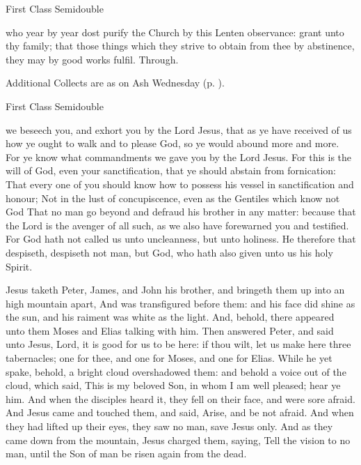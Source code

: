 \begin{inhead}
{First Class Semidouble}
\end{inhead}

\collect
{} who year by year dost purify the Church by this Lenten observance: grant unto thy family; that those things which they strive to obtain from thee by abstinence, they may by good works fulfil. Through.
\begin{rubric}
    Additional Collects are as on Ash Wednesday (p. \pageref{AshWednesdayMass}).
\end{rubric}


\begin{inhead}
{First Class Semidouble}
\end{inhead}

 we beseech you, and exhort you by the Lord Jesus, that as ye have received of us how ye ought to walk and to please God, so ye would abound more and more. For ye know what commandments we gave you by the Lord Jesus. For this is the will of God, even your sanctification, that ye should abstain from fornication: That every one of you should know how to possess his vessel in sanctification and honour; Not in the lust of concupiscence, even as the Gentiles which know not God That no man go beyond and defraud his brother in any matter: because that the Lord is the avenger of all such, as we also have forewarned you and testified. For God hath not called us unto uncleanness, but unto holiness. He therefore that despiseth, despiseth not man, but God, who hath also given unto us his holy Spirit.

 Jesus taketh Peter, James, and John his brother, and bringeth them up into an high mountain apart, And was transfigured before them: and his face did shine as the sun, and his raiment was white as the light. And, behold, there appeared unto them Moses and Elias talking with him. Then answered Peter, and said unto Jesus, Lord, it is good for us to be here: if thou wilt, let us make here three tabernacles; one for thee, and one for Moses, and one for Elias. While he yet spake, behold, a bright cloud overshadowed them: and behold a voice out of the cloud, which said, This is my beloved Son, in whom I am well pleased; hear ye him. And when the disciples heard it, they fell on their face, and were sore afraid. And Jesus came and touched them, and said, Arise, and be not afraid. And when they had lifted up their eyes, they saw no man, save Jesus only. And as they came down from the mountain, Jesus charged them, saying, Tell the vision to no man, until the Son of man be risen again from the dead.

